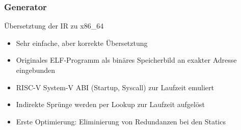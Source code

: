 
\begin{frame}

    \frametitle{Generator}{Übersetztung der IR zu x86\_64}
    \begin{itemize}
        \item Sehr einfache, aber korrekte Übersetztung
        \item Originales ELF-Programm als binäres Speicherbild an exakter Adresse eingebunden
        \item RISC-V System-V ABI (Startup, Syscall) zur Laufzeit emuliert
        \item Indirekte Sprünge werden per Lookup zur Laufzeit aufgelöst
        \item Erste Optimierung: Eliminierung von Redundanzen bei den Statics
    \end{itemize}
\end{frame}
\clearpage


